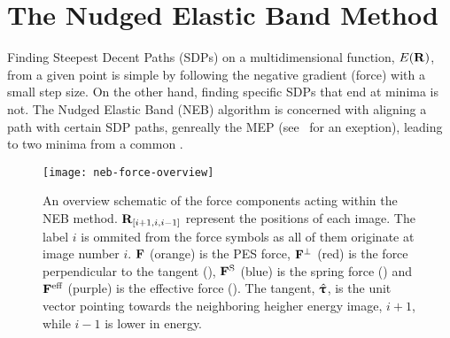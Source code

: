 \section{The Nudged Elastic Band Method}
\label{sec:neb}


Finding Steepest Decent Paths (SDPs) on a multidimensional function, $E({\mathrm{\mathbf{\bm{R}}}})$, from a given point is simple by following the negative gradient (force) with a small step size.
On the other hand, finding specific SDPs that end at minima is not.
The Nudged Elastic Band (NEB) algorithm is concerned with aligning a path with certain SDP paths, genreally the MEP (see~\cite{neb-polemic-henkelman1} for an exeption), leading to two minima from a common .

\begin{figure}[h]
  \begin{center}
    \texttt{[image: neb-force-overview]}
\parbox{0.85\linewidth}{\caption{An overview schematic of the force components acting within the NEB method.
${\mathrm{\mathbf{\bm{R}}}}_{[i+1, i, i-1]}$ represent the positions of each image.
The label $i$ is ommited from the force symbols as all of them originate at image number $i$.
${\mathrm{\mathbf{\bm{F}}}}$ (orange) is the PES force,
${\mathrm{\mathbf{\bm{F}}}}^\perp$ (red) is the force perpendicular to the tangent (),
${\mathrm{\mathbf{\bm{F}}}}^\text{S}$ (blue) is the spring force () and
${\mathrm{\mathbf{\bm{F}}}}^\text{eff}$ (purple) is the effective force ().
The tangent, $\hat{{\mathrm{\mathbf{\bm{\uptau}}}}}$, is the unit vector pointing towards the neighboring heigher energy image, $i+1$, while $i-1$ is lower in energy.
}
\label{fig:neb-force-overview}
}
  \end{center}
\end{figure}

